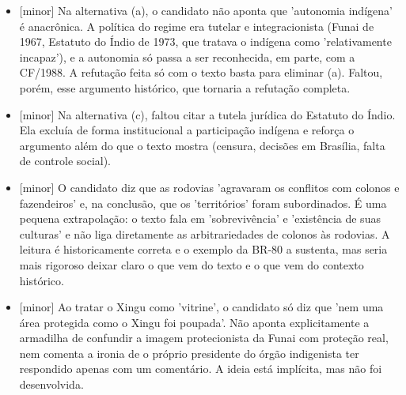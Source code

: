 \documentclass{article}%
\begin{document}
\begin{itemize}%
\item%
{[}minor{]} Na alternativa (a), o candidato não aponta que 'autonomia indígena' é anacrônica. A política do regime era tutelar e integracionista (Funai de 1967, Estatuto do Índio de 1973, que tratava o indígena como 'relativamente incapaz'), e a autonomia só passa a ser reconhecida, em parte, com a CF/1988. A refutação feita só com o texto basta para eliminar (a). Faltou, porém, esse argumento histórico, que tornaria a refutação completa.%
\item%
{[}minor{]} Na alternativa (c), faltou citar a tutela jurídica do Estatuto do Índio. Ela excluía de forma institucional a participação indígena e reforça o argumento além do que o texto mostra (censura, decisões em Brasília, falta de controle social).%
\item%
{[}minor{]} O candidato diz que as rodovias 'agravaram os conflitos com colonos e fazendeiros' e, na conclusão, que os 'territórios' foram subordinados. É uma pequena extrapolação: o texto fala em 'sobrevivência' e 'existência de suas culturas' e não liga diretamente as arbitrariedades de colonos às rodovias. A leitura é historicamente correta e o exemplo da BR{-}80 a sustenta, mas seria mais rigoroso deixar claro o que vem do texto e o que vem do contexto histórico.%
\item%
{[}minor{]} Ao tratar o Xingu como 'vitrine', o candidato só diz que 'nem uma área protegida como o Xingu foi poupada'. Não aponta explicitamente a armadilha de confundir a imagem protecionista da Funai com proteção real, nem comenta a ironia de o próprio presidente do órgão indigenista ter respondido apenas com um comentário. A ideia está implícita, mas não foi desenvolvida.%
\end{itemize}%
\end{document}
